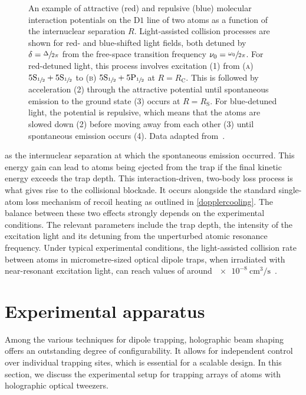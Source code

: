\documentclass[../Thesis-IJspeert.tex]{subfiles}
\begin{document}
\begin{figure}
	\caption[Molecular interaction potentials and light-assisted collision processes for two  atoms]{An example of attractive (red) and repulsive (blue) molecular interaction potentials on the $\mathrm{D}1$ line of two  atoms as a function of the internuclear separation $R$. Light-assisted collision processes are shown for red- and blue-shifted light fields, both detuned by $\delta=\sfrac{\Delta}{2\pi}$ from the free-space transition frequency $\nu_0=\sfrac{\omega_0}{2\pi}$. For red-detuned light, this process involves excitation (1) from \textsc{(a)} $5\mathrm{S}_{\sfrac{1}{2}}+5\mathrm{S}_{\sfrac{1}{2}}$ to \textsc{(b)} $5\mathrm{S}_{\sfrac{1}{2}}+5\mathrm{P}_{\sfrac{1}{2}}$ at $R=R_\mathrm{C}$. This is followed by acceleration (2) through the attractive potential until spontaneous emission to the ground state (3) occurs at $R=R_\mathrm{S}$. For blue-detuned light, the potential is repulsive, which means that the atoms are slowed down (2) before moving away from each other (3) until spontaneous emission occurs (4). Data adapted from~\cite{Pampel_2024}.}
	\label{lightassistedcollisions} 
\end{figure}
as the internuclear separation at which the spontaneous emission occurred. This energy gain can lead to atoms being ejected from the trap if the final kinetic energy exceeds the trap depth. This interaction-driven, two-body loss process is what gives rise to the collisional blockade. It occurs alongside the standard single-atom loss mechanism of recoil heating as outlined in \autoref{dopplercooling}. The balance between these two effects strongly depends on the experimental conditions. The relevant parameters include the trap depth, the intensity of the excitation light and its detuning from the unperturbed atomic resonance frequency. Under typical experimental conditions, the light-assisted collision rate between  atoms in micrometre-sized optical dipole traps, when irradiated with near-resonant excitation light, can reach values of around $\SI{e-8}{\centi\meter\cubed\per\second}$~\cite{fuhrmanek2012}.
\section{Experimental apparatus}
Among the various techniques for dipole trapping, holographic beam shaping offers an outstanding degree of configurability. It allows for independent control over individual trapping sites, which is essential for a scalable design. In this section, we discuss the experimental setup for trapping arrays of  atoms with holographic optical tweezers.
\end{document}

